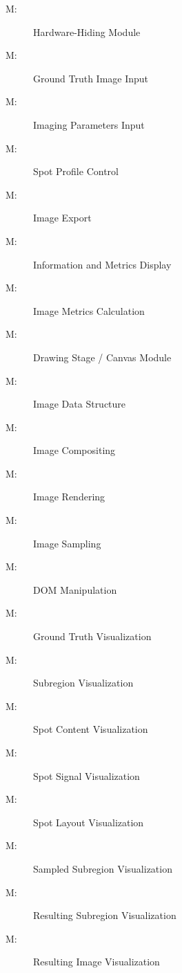 \documentclass[12pt, titlepage]{article}
\newcounter{mnum}
\newcommand{\mthemnum}{M\themnum}
\begin{document}
\begin{description}
\item [ \mthemnum \label{M_HdwHide}:] Hardware-Hiding Module
\item [ \mthemnum \label{M_imgGTInput}:] Ground Truth Image Input
\item [ \mthemnum \label{M_params}:] Imaging Parameters Input
\item [ \mthemnum \label{M_vizSpotProfile}:] Spot Profile Control
\item [ \mthemnum \label{M_export}:] Image Export
\item [ \mthemnum \label{M_infoDisp}:] Information and Metrics Display
\item [ \mthemnum \label{M_metric}:] Image Metrics Calculation
\item [ \mthemnum \label{M_drawStage}:] Drawing Stage / Canvas Module
\item [ \mthemnum \label{M_imgDataStruct}:] Image Data Structure
\item [ \mthemnum \label{M_compositing}:] Image Compositing
\item [ \mthemnum \label{M_rendering}:] Image Rendering
\item [ \mthemnum \label{M_sampling}:] Image Sampling
\item [ \mthemnum \label{M_DOM}:] DOM Manipulation
\item [ \mthemnum \label{M_vizGT}:] Ground Truth Visualization
\item [ \mthemnum \label{M_vizSubregion}:] Subregion Visualization
\item [ \mthemnum \label{M_vizSpotContent}:] Spot Content Visualization
\item [ \mthemnum \label{M_vizSpotSignal}:] Spot Signal Visualization
\item [ \mthemnum \label{M_vizSpotLayout}:] Spot Layout Visualization
\item [ \mthemnum \label{M_vizSampledSub}:] Sampled Subregion Visualization
\item [ \mthemnum \label{M_vizResultSub}:] Resulting Subregion Visualization
\item [ \mthemnum \label{M_vizResultImg}:] Resulting Image Visualization
\end{description}
\end{document}
